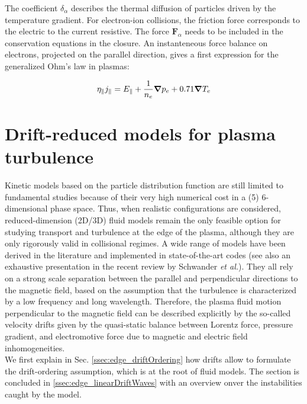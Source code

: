 The coefficient $\delta_\alpha$ describes the thermal diffusion of particles driven by the temperature gradient. For electron-ion collisions, the friction force corresponds to the electric to the current resistive. The force $\textbf{F}_\alpha$ needs to be included in the conservation equations in the closure. An instanteneous force balance on electrons, projected on the parallel direction, gives a first expression for the generalized Ohm's law in plasmas:

\begin{equation}
	\eta_\parallel j_\parallel = E_\parallel + \frac{1}{n_e}\grad p_e + 0.71\grad{T_e}
\end{equation}



\section{Drift-reduced models for plasma turbulence}
\label{sec:edge_driftWaves}


Kinetic models based on the particle distribution function\cite{DifPradalier_2009, Charidakos_2018} are still limited to fundamental studies because of their very high numerical cost in a (5) 6-dimensional phase space. Thus, when realistic configurations are considered, reduced-dimension (2D/3D) fluid models remain the only feasible option for studying transport and turbulence at the edge of the plasma, although they are only rigorously valid in collisional regimes. A wide range of models have been derived in the literature and implemented in state-of-the-art codes\cite{DUDSON_2009, giacomin2022gbs, stegmeir2019} (see also an exhaustive presentation in the recent review by Schwander \emph{et al.}\cite{SCHWANDER_2024}). They all rely on a strong scale separation between the parallel and perpendicular directions to the magnetic field, based on the assumption that the turbulence is characterized by a low frequency and long wavelength. Therefore, the plasma fluid motion perpendicular to the magnetic field can be described explicitly by the so-called velocity drifts given by the quasi-static balance between Lorentz force, pressure gradient, and electromotive force due to magnetic and electric field inhomogeneities. \\

We first explain in Sec. \ref{ssec:edge_driftOrdering} how drifts allow to formulate the drift-ordering assumption, which is at the root of fluid models. The section is concluded in \ref{ssec:edge_linearDriftWaves} with an overview onver the instabilities caught by the model. 


